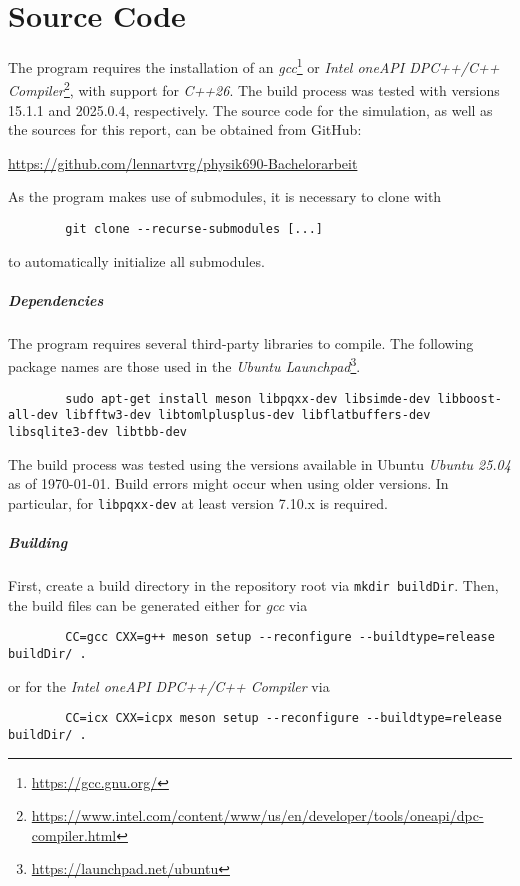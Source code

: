 \chapter{Source Code}\label{chap:source_code}
	The program requires the installation of an \emph{gcc}\footnote{\url{https://gcc.gnu.org/}} or \emph{Intel\textsuperscript{\tiny\textregistered} oneAPI DPC++/C++ Compiler}\footnote{\url{https://www.intel.com/content/www/us/en/developer/tools/oneapi/dpc-compiler.html}}, with support for \emph{C++26}. The build process was tested with versions 15.1.1 and 2025.0.4, respectively. The source code for the simulation, as well as the sources for this report, can be obtained from GitHub:
	\begin{center}
		\url{https://github.com/lennartvrg/physik690-Bachelorarbeit}
	\end{center}
	As the program makes use of submodules, it is necessary to clone with 
	\begin{verbatim}
		git clone --recurse-submodules [...]
	\end{verbatim}
	to automatically initialize all submodules.
	
	\paragraph{Dependencies}
	The program requires several third-party libraries to compile. The following package names are those used in the \emph{Ubuntu Launchpad}\footnote{\url{https://launchpad.net/ubuntu}}.
	\begin{verbatim}
		sudo apt-get install meson libpqxx-dev libsimde-dev libboost-all-dev libfftw3-dev libtomlplusplus-dev libflatbuffers-dev libsqlite3-dev libtbb-dev
	\end{verbatim}
	The build process was tested using the versions available in Ubuntu \emph{Ubuntu 25.04} as of \today. Build errors might occur when using older versions. In particular, for \texttt{libpqxx-dev} at least version 7.10.x is required.
	
	\paragraph{Building}
	First, create a build directory in the repository root via \texttt{mkdir buildDir}. Then, the build files can be generated either for \emph{gcc} via
	\begin{verbatim}
		CC=gcc CXX=g++ meson setup --reconfigure --buildtype=release buildDir/ .
	\end{verbatim}
	or for the \emph{Intel\textsuperscript{\tiny\textregistered} oneAPI DPC++/C++ Compiler} via
	\begin{verbatim}
		CC=icx CXX=icpx meson setup --reconfigure --buildtype=release buildDir/ .
	\end{verbatim}